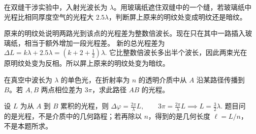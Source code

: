 \begin{exercise}
在双缝干涉实验中，入射光波长为 \(\lambda\)。用玻璃纸遮住双缝中的一个缝，若玻璃纸中光程比相同厚度空气的光程大 \(2.5\lambda\)，判断屏上原来的明纹处变成明纹还是暗纹。
\end{exercise}

\begin{solution}
原来的明纹处说明两路光到该点的光程差为整数倍波长。现在只在其中一路插入玻璃纸，相当于额外增加一段光程差。
新的总光程差为
 \(\Delta L =k\lambda+2.5\lambda =\left(k+2+\frac12\right)\lambda.\) 
它比整数倍波长多出半个波长，因此两束光在原明纹处变为反相。所以屏上原来的明纹处变为暗纹。
\end{solution}

\begin{exercise}
在真空中波长为 \(\lambda\) 的单色光，在折射率为 \(n\) 的透明介质中从 \(A\) 沿某路径传播到 \(B\)。若 \(A,B\) 两点相位差为 \(3\pi\)，求此路径 \(AB\) 的光程。
\end{exercise}

\begin{solution}
设 \(L\) 为从 \(A\) 到 \(B\) 累积的光程，则
 \(\Delta\varphi=\frac{2\pi}{\lambda}L,\qquad 3\pi=\frac{2\pi}{\lambda}L \implies L=\frac{3}{2}\lambda.\) 
题目问的是光程，不是介质中的几何路程；若再除以 \(n\)，得到的是几何长度 \(\ell=L/n\)，不是本题所求。
\end{solution}
